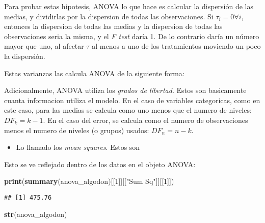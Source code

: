 \documentclass[]{article}
\newenvironment{Shaded}{\begin{snugshade}}{\end{snugshade}}
\newcommand{\KeywordTok}[1]{\textcolor[rgb]{0.13,0.29,0.53}{\textbf{#1}}}
\newcommand{\DecValTok}[1]{\textcolor[rgb]{0.00,0.00,0.81}{#1}}
\newcommand{\StringTok}[1]{\textcolor[rgb]{0.31,0.60,0.02}{#1}}
\newcommand{\NormalTok}[1]{#1}
\providecommand{\tightlist}{%
  \setlength{\itemsep}{0pt}\setlength{\parskip}{0pt}}
\begin{document}
Para probar estas hipotesis, ANOVA lo que hace es calcular la dispersión
de las medias, y dividirlas por la dispersion de todas las
observaciones. Si \(\tau_i=0 \forall i\), entonces la dispersion de
todas las medias y la dispersion de todas las observaciones seria la
misma, y el \emph{F test} daría 1. De lo contrario daría un número mayor
que uno, al afectar \(\tau\) al menos a uno de los tratamientos moviendo
un poco la dispersión.

Estas varianzas las calcula ANOVA de la siguiente forma:

Adicionalmente, ANOVA utiliza los \emph{grados de libertad}. Estos son
basicamente cuanta informacion utiliza el modelo. En el caso de
variables categoricas, como en este caso, para las medias se calcula
como uno menos que el numero de niveles: \(DF_k=k-1\). En el caso del
error, se calcula como el numero de observaciones menos el numero de
niveles (o grupos) usados: \(DF_n=n-k\).

\begin{itemize}
\tightlist
\item
  Lo llamado los \emph{mean squares}. Estos son
\end{itemize}

Esto se ve reflejado dentro de los datos en el objeto ANOVA:

\begin{Shaded}
\begin{Highlighting}[]
\KeywordTok{print}\NormalTok{(}\KeywordTok{summary}\NormalTok{(anova_algodon)[[}\DecValTok{1}\NormalTok{]][[}\StringTok{"Sum Sq"}\NormalTok{]][[}\DecValTok{1}\NormalTok{]])}
\end{Highlighting}
\end{Shaded}

\begin{verbatim}
## [1] 475.76
\end{verbatim}

\begin{Shaded}
\begin{Highlighting}[]
\KeywordTok{str}\NormalTok{(anova_algodon)}
\end{Highlighting}
\end{Shaded}
\end{document}
